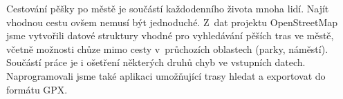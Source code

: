 Cestování pěšky po městě je součástí každodenního života mnoha lidí. Najít
vhodnou cestu ovšem nemusí být jednoduché. Z~dat projektu OpenStreetMap jsme
vytvořili datové struktury vhodné pro vyhledávání pěších tras ve městě, včetně
možnosti chůze mimo cesty v~průchozích oblastech (parky, náměstí). Součástí
práce je i ošetření některých druhů chyb ve vstupních datech. Naprogramovali jsme
také aplikaci umožňující trasy hledat a exportovat do formátu GPX.

